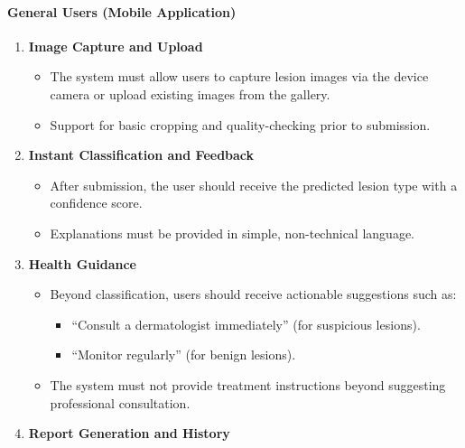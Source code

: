 \documentclass[
  12pt,
  oneside]{article}
\providecommand{\tightlist}{%
  \setlength{\itemsep}{0pt}\setlength{\parskip}{0pt}}
\begin{document}
\paragraph{General Users (Mobile
Application)}\label{general-users-mobile-application}

\begin{enumerate}
\def\labelenumi{\arabic{enumi}.}
\item
  \textbf{Image Capture and Upload}

  \begin{itemize}
  \tightlist
  \item
    The system must allow users to capture lesion images via the device
    camera or upload existing images from the gallery.\\
  \item
    Support for basic cropping and quality-checking prior to submission.
  \end{itemize}
\item
  \textbf{Instant Classification and Feedback}

  \begin{itemize}
  \tightlist
  \item
    After submission, the user should receive the predicted lesion type
    with a confidence score.\\
  \item
    Explanations must be provided in simple, non-technical language.
  \end{itemize}
\item
  \textbf{Health Guidance}

  \begin{itemize}
  \item
    Beyond classification, users should receive actionable suggestions
    such as:

    \begin{itemize}
    \tightlist
    \item
      ``Consult a dermatologist immediately'' (for suspicious
      lesions).\\
    \item
      ``Monitor regularly'' (for benign lesions).
    \end{itemize}
  \item
    The system must not provide treatment instructions beyond suggesting
    professional consultation.
  \end{itemize}
\item
  \textbf{Report Generation and History}


\end{enumerate}
\end{document}
